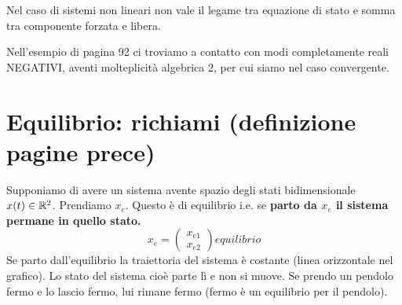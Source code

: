 \documentclass[a4paper]{report}
\begin{document}
\bb
Nel caso di sistemi non lineari non vale il legame tra equazione di stato e somma tra componente forzata e libera.

\begin{defin}{}{}
Nell'esempio di pagina 92 ci troviamo a contatto con modi completamente reali NEGATIVI, aventi molteplicità algebrica 2, per cui siamo nel caso convergente.	
\end{defin}

\newpage
\section{Equilibrio: richiami (definizione pagine prece)}
Supponiamo di avere un sistema avente spazio degli stati bidimensionale $x(t) \in \mathbb{R}^2$. Prendiamo $x_e$. Questo è di equilibrio i.e. se \textbf{parto da $x_e$ il sistema permane in quello stato.}
\begin{equation*}
	x_e = \begin{pmatrix}
		x_{e1} \\ x_{e2}
	\end{pmatrix} equilibrio
\end{equation*}
Se parto dall'equilibrio la traiettoria del sistema è costante (linea orizzontale nel grafico). Lo stato del sistema cioè parte lì e non si muove. Se prendo un pendolo fermo e lo lascio fermo, lui rimane fermo (fermo è un equilibrio per il pendolo).
\end{document}
